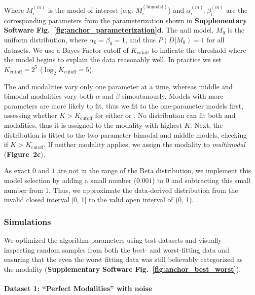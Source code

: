 Where $M_i^{(m)}$ is the model of interest (e.g. $M_i^{(\mathrm{bimodal})}$) and $\alpha_i^{(m)}, \beta_i^{(m)}$ are the corresponding parameters from the parameterization shown in \textbf{Supplementary Software Fig.~\ref{fig:anchor_parameterization}d}. The null model, $M_0$ is the uniform distribution, where $\alpha_0 = \beta_0 = 1$, and thus $P(D|M_0) = 1$ for all datasets. We use a Bayes Factor cutoff of $K_{\mathrm{cutoff}}$ to indicate the threshold where the model begins to explain the data reasonably well. In practice we set $K_{\mathrm{cutoff}} = 2^{5}$ ($\log_2 K_\mathrm{cutoff} = 5$).

The \0 and \1 modalities vary only one parameter at a time, whereas middle and bimodal modalities vary both $\alpha$ and $\beta$ simoutanously. Models with more parameters are more likely to fit, thus we fit to the one-parameter models first, assessing whether $K > K_{\mathrm{cutoff}}$ for either \0 or \1. No distribution can fit both \0 and \1 modalities, thus it is assigned to the modality with highest $K$. Next, the distribution is fitted to the two-parameter bimodal and middle models, checking if $K > K_{\mathrm{cutoff}}$. If neither modality applies, we assign the modality to \emph{multimodal} (\textbf{Figure~2c}). 


As exact $0$ and $1$ are not in the range of the Beta distribution, we implement this model selection by adding a small number ($0.001$) to $0$ and subtracting this small number from $1$. Thus, we approximate the data-derived distribution from the invalid closed interval [0, 1] to the valid open interval of (0, 1).


\subsubsection{Simulations}

We optimized the algorithm parameters using test datasets and visually inspecting random samples from both the best- and worst-fitting data and ensuring that the even the worst fitting data was still believably categorized as the modality (\textbf{Supplementary Software Fig.~\ref{fig:anchor_best_worst}}).

\paragraph{Dataset 1: ``Perfect Modalities'' with noise}
\label{sec:anchor_perfect_modalities}


